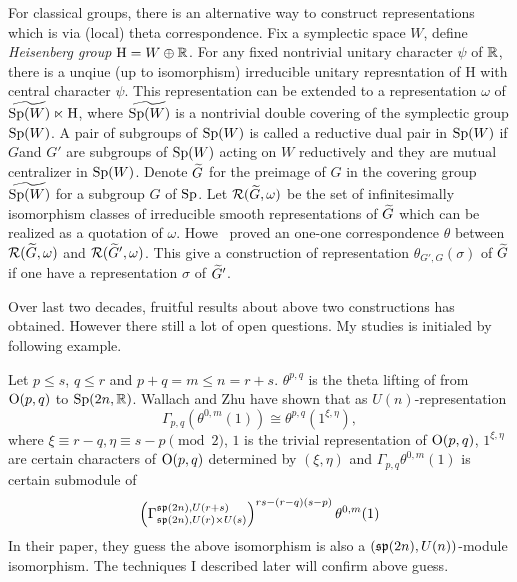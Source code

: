 \documentclass{amsart}
\begin{document}
For classical groups, there is an alternative way to construct
representations which is 
via (local) theta correspondence.  
Fix a symplectic space $W$, define
\emph{Heisenberg group} $\mathrm{H} = W\oplus \bR$. For any fixed nontrivial
unitary character $\psi$ of $\bR$, there is a unqiue (up to
isomorphism) irreducible unitary represntation of $\mathrm{H}$ with
central character $\psi$.  This representation can be extended to a
representation $\omega$ of $\widetilde{\Sp(W)}\ltimes \mathrm{H}$,
where $\widetilde{\Sp(W)}$ is a nontrivial double covering of the
symplectic group $\Sp(W)$.
A pair of subgroups of $\Sp(W)$ is called  a reductive dual pair in
$\Sp(W)$ if $G$and $G'$  are subgroups of $\Sp(W)$  acting on $W$ reductively
and they are mutual centralizer in $\Sp(W)$. 
Denote $\tG$ for the preimage of $G$ in the covering group
$\widetilde{\Sp(W)}$ for a subgroup $G$ of $\Sp$.  Let
$\sR(\tG,\omega)$ be the set of infinitesimally isomorphism classes of irreducible
smooth representations of $\tG$ which can be realized as a quotation
of $\omega$.  Howe~\cite{Howe1989Tran} proved an one-one correspondence
$\theta$ between $\sR(\tG,\omega)$ and $\sR(\tG',\omega)$.  This give
a construction of representation $\theta_{G',G}(\sigma)$ of $\tG$ if one have a representation $\sigma$
of $\tG'$. 

Over last two decades, fruitful results about above two constructions has obtained. However there still a lot of open questions.
My studies is initialed by following example.
\begin{eg}\label{eg:wz2004}
Let $p\leq s$, $q\leq r$ and
$p+q=m\leq n=r+s$. 
$\theta^{p,q}$ is the theta lifting of  from $\O(p,q)$ to $\Sp(2n,\bR)$.
Wallach and Zhu \cite{WallachZhu2004} have shown that as $U(n)$-representation
\[
\Gamma_{p,q}(\theta^{0,m}(1)) \cong \theta^{p,q}(1^{\xi,\eta}),
\]
where $\xi \equiv r-q, \eta\equiv s-p \pmod{2}$, $1$ is the trivial representation of $\O(p,q)$, $1^{\xi,\eta}$ are certain characters of $\O(p,q)$
determined by $(\xi, \eta)$ and
$\Gamma_{p,q}\theta^{0,m}(1)$ is certain submodule of 
\[
\left(\Gamma_{\sp(2n),U(r)\times U(s)}^{\sp(2n), U(r+s)}\right)^{rs-(r-q)(s-p)}\theta^{0,m}(1)
\]
In their paper, they guess  the above isomorphism is also a $(\sp(2n), U(n))$-module isomorphism.
The techniques  I described later will confirm above guess.
\end{eg}
\end{document}
